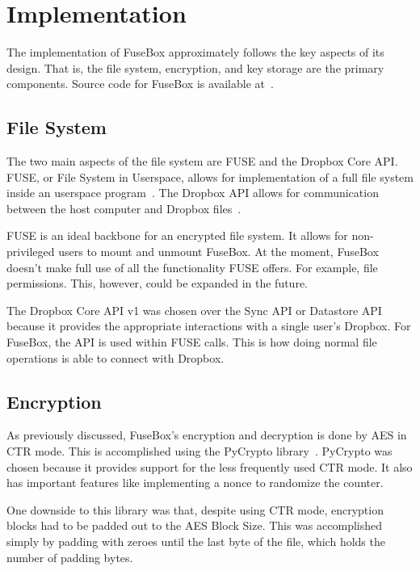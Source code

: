\documentclass[11pt,twocolumn,letterpaper]{article}
\newcommand{\appname}{FuseBox }
\newcommand{\appnameWOspace}{FuseBox}
\begin{document}
\section{Implementation}
\label{sec:implementation}
The implementation of \appname approximately follows the key aspects
of its design. That is, the file system, encryption, and key storage
are the primary components. Source code for \appname is available at~\cite{FuseBox}.

\subsection{File System}
\label{sec:fsimp}
The two main aspects of the file system are FUSE and the Dropbox Core
API. FUSE, or File System in Userspace, allows for implementation of a
full file system inside an userspace program~\cite{fuse}. The Dropbox
API allows for communication between the host computer and Dropbox
files~\cite{dropboxcore}.
\par FUSE is an ideal backbone for an encrypted file system. It allows
for non-privileged users to mount and unmount \appnameWOspace. At the
moment, \appname doesn't make full use of all the functionality FUSE
offers. For example, file permissions. This, however, could be expanded in the future. 
\par The Dropbox Core API v1 was chosen over the Sync API or Datastore
API because it provides the appropriate interactions with a single
user's Dropbox. For \appnameWOspace, the API is used within FUSE
calls. This is how doing normal file operations is able to connect
with Dropbox. 

\subsection{Encryption}
\label{sec:encimp}
As previously discussed, \appnameWOspace's encryption and decryption
is done by AES in CTR mode. This is accomplished using the  PyCrypto
library~\cite{pycrypto}.
PyCrypto was chosen because it provides support for the less
frequently used CTR
mode. It also has important features like implementing a nonce to
randomize the counter. 
\par One downside to this library was that, despite using CTR mode,
encryption blocks had to be padded out to the AES Block Size. This was
accomplished simply by padding with zeroes until the last byte of the
file, which holds the number of padding bytes.  
\end{document}
